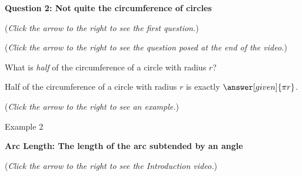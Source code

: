 \documentclass{ximera}
\begin{document}
\textbf{Question 2: Not quite the circumference of circles}
\begin{question}
\begin{flushright}
{\color{blue}(\emph{Click the arrow to the right to see the first question.})}
\end{flushright}
\begin{center}
\begin{expandable}
\begin{flushright}
{\color{blue}(\emph{Click the arrow to the right to see the question
posed at the end of the video.})}
\end{flushright}
\begin{expandable}
What is \emph{half} of the circumference of a circle with radius $r$?
\begin{prompt}
Half of the circumference of a circle with radius $r$ is exactly $\answer[given]{\pi r}$.
\end{prompt}
\begin{flushright}
{\color{blue}(\emph{Click the arrow to the right to see an example.})}
\end{flushright}
\begin{expandable}
\begin{center}
Example 2
\end{center}
\end{expandable}
\end{expandable}
\end{expandable}
\end{center}
\end{question}


\textbf{Arc Length: The length of the arc subtended by an angle}
\begin{explanation}
\begin{flushright}
{\color{blue}(\emph{Click the arrow to the right to see the Introduction video.})}
\end{flushright}
\begin{center}
\begin{expandable}
\end{expandable}
\end{center}
\end{explanation}
\end{document}
